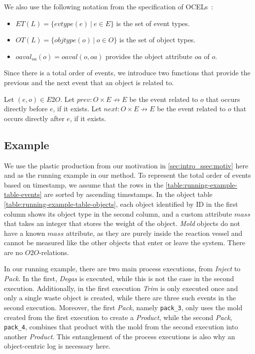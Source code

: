     
    We also use the following notation from the specification of OCELs~\autocite{ocel20}:
    \begin{itemize}
        \item 
        $ET(L) = \{ evtype(e)\ |\ e \in E \}$ is the set of event types.
    
        \item
        $OT(L) = \{objtype(o)\ |\ o \in O\}$ is the set of object types.
    
    
            \item 
            $oaval_{oa}(o) = oaval(o, oa)$ provides the object attribute $oa$ of $o$.
    \end{itemize}

    Since there is a total order of events, we introduce two functions that provide the previous and the next event that an object is related to.
    \begin{definition}
        Let $(e, o) \in E2O$.
        Let $prev: O \times E \not\to E$ be the event related to $o$ that occurs directly before $e$, if it exists.
        Let $next: O \times E \not\to E$ be the event related to $o$ that occurs directly after $e$, if it exists.
    \end{definition}
    
    
    
    \subsection{Example}
    \label{chap:running-example}
    
    
    
    We use the plastic production from our motivation in \cref{sec:intro_ssec:motiv} here and as the running example in our method.
    To represent the total order of events based on timestamp, we assume that the rows in the \autoref{table:running-example-table-events} are sorted by ascending timestamps.
    In the object table \autoref{table:running-example-table-objects}, each object identified by ID in the first column shows its object type in the second column, and a custom attribute $mass$ that takes an integer that stores the weight of the object.
    \emph{Mold} objects do not have a known $mass$ attribute, as they are purely inside the reaction vessel and cannot be measured like the other objects that enter or leave the system.
    There are no $O2O$-relations.


    In our running example, there are two main process executions, from \emph{Inject} to \emph{Pack}.
    In the first, \emph{Degas} is executed, while this is not the case in the second execution.
    Additionally, in the first execution \emph{Trim} is only executed once and only a single waste object is created, while there are three such events in the second execution.
    Moreover, the first \emph{Pack}, namely \texttt{pack\_3}, only uses the mold created from the first execution to create a \emph{Product}, while the second \emph{Pack}, \texttt{pack\_4}, combines that product with the mold from the second execution into another \emph{Product}.
    This entanglement of the process executions is also why an object-centric log is necessary here.


